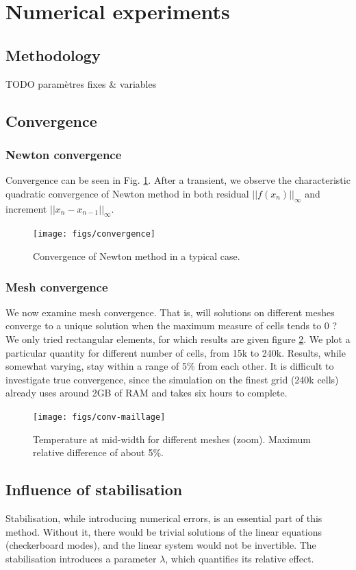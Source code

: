 \documentclass[12pt]{article}
\begin{document}
\section{Numerical experiments}
\subsection{Methodology}
TODO param\`etres fixes \& variables
\subsection{Convergence}
\subsubsection{Newton convergence}
\label{sec:conv_newton}
Convergence can be seen in Fig. \ref{fig:conv_newton}. After a
transient, we observe the characteristic quadratic convergence of
Newton method in both residual $||f(x_n)||_\infty$ and increment $||x_{n} -
x_{n-1}||_\infty$.
\begin{figure}[htb]
\centering
\texttt{[image: figs/convergence]}
\caption{Convergence of Newton method in a typical case.}
\label{fig:conv_newton}
\end{figure}

\subsubsection{Mesh convergence}
We now examine mesh convergence. That is, will solutions on different
meshes converge to a unique solution when the maximum measure of cells
tends to 0 ? We only tried rectangular elements, for which results are
given figure \ref{fig:conv-maillage}. We plot a particular quantity
for different number of cells, from 15k to 240k. Results, while
somewhat varying, stay within a range of 5\% from each other. It is
difficult to investigate true convergence, since the simulation on the
finest grid (240k cells) already uses around 2GB of RAM and takes six
hours to complete.

\begin{figure}[htb]
\centering
\texttt{[image: figs/conv-maillage]}
\caption{Temperature at mid-width for different meshes (zoom). Maximum
  relative difference of about 5\%.}
\label{fig:conv-maillage}
\end{figure}
\subsection{Influence of stabilisation}
Stabilisation, while introducing numerical errors, is an essential
part of this method. Without it, there would be trivial solutions of
the linear equations (checkerboard modes), and the linear system would
not be invertible. The stabilisation introduces a parameter $\lambda$,
which quantifies its relative effect.
\end{document}
